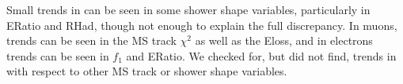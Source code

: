 



Small trends in \dz can be seen in some shower shape variables, particularly in ERatio and RHad, though not enough to explain the full discrepancy. In muons, trends can be seen in the \ac{MS} track $\chi^{2}$ as well as the Eloss, and in electrons trends can be seen in $f_{1}$ and ERatio. We checked for, but did not find, trends in \dz with respect to other \ac{MS} track or shower shape variables. 


